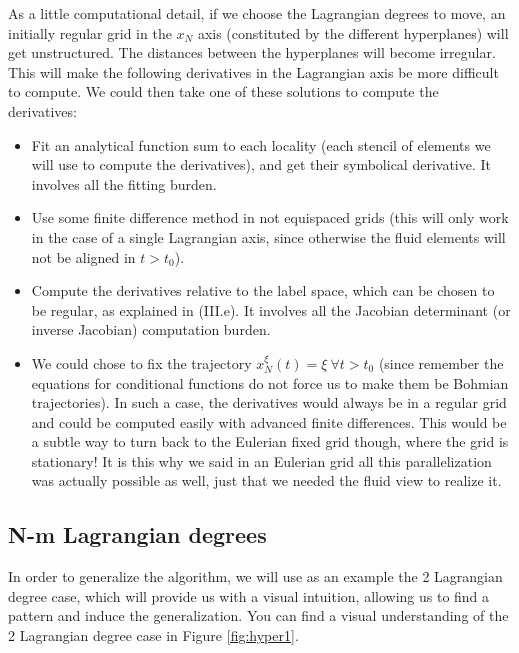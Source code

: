 \documentclass[11pt, a4paper]{article} %
\begin{document}
As a little computational detail, if we choose the Lagrangian degrees to move, an initially regular grid in the $x_N$ axis (constituted by the different hyperplanes) will get unstructured. The distances between the hyperplanes will become irregular. This will make the following derivatives in the Lagrangian axis be more difficult to compute. We could then take one of these solutions to compute the derivatives:
\begin{itemize}
\item Fit an analytical function sum to each locality (each stencil of elements we will use to compute the derivatives), and get their symbolical derivative. It involves all the fitting burden.
\item Use some finite difference method in not equispaced grids (this will only work in the case of a single Lagrangian axis, since otherwise the fluid elements will not be aligned in $t>t_0$).
\item Compute the derivatives relative to the label space, which can be chosen to be regular, as explained in (III.e). It involves all the Jacobian determinant (or inverse Jacobian) computation burden.
\item We could chose to fix the trajectory $x_N^\xi(t)=\xi\ \forall t>t_0$ (since remember the equations for conditional functions do not force us to make them be Bohmian trajectories). In such a case, the derivatives would always be in a regular grid and could be computed easily with advanced finite differences. This would be a subtle way to turn back to the Eulerian fixed grid though, where the grid is stationary! It is this why we said in an Eulerian grid all this parallelization was actually possible as well, just that we needed the fluid view to realize it.
\end{itemize} 



\subsection*{N-m Lagrangian degrees}
In order to generalize the algorithm, we will use as an example the 2 Lagrangian degree case, which will provide us with a visual intuition, allowing us to find a pattern and induce the generalization. You can find a visual understanding of the 2 Lagrangian degree case in Figure \ref{fig:hyper1}.
\end{document}
